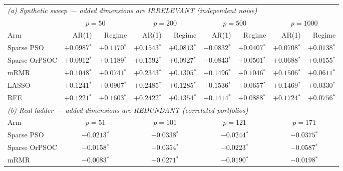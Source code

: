 \begin{table}[htbp]
    \centering
    \small\setlength{\tabcolsep}{4pt}
    \begin{tabular}{lrrrrrrrr}
    \hline
    \multicolumn{9}{l}{\textit{(a) Synthetic sweep --- added dimensions are IRRELEVANT (independent noise)}} \\
    & \multicolumn{2}{c}{$p = 50$} & \multicolumn{2}{c}{$p = 200$} & \multicolumn{2}{c}{$p = 500$} & \multicolumn{2}{c}{$p = 1000$} \\
    Arm & AR(1) & Regime & AR(1) & Regime & AR(1) & Regime & AR(1) & Regime \\
    \hline
    Sparse PSO & $+0.0987$$^{*}$ & $+0.1170$$^{*}$ & $+0.1543$$^{*}$ & $+0.0813$$^{*}$ & $+0.0832$$^{*}$ & $+0.0407$$^{*}$ & $+0.0708$$^{*}$ & $+0.0138$$^{*}$ \\
    Sparse OrPSOC & $+0.0912$$^{*}$ & $+0.1189$$^{*}$ & $+0.1592$$^{*}$ & $+0.0927$$^{*}$ & $+0.0843$$^{*}$ & $+0.0501$$^{*}$ & $+0.0688$$^{*}$ & $+0.0155$$^{*}$ \\
    mRMR & $+0.1048$$^{*}$ & $+0.0741$$^{*}$ & $+0.2343$$^{*}$ & $+0.1305$$^{*}$ & $+0.1496$$^{*}$ & $+0.1046$$^{*}$ & $+0.1506$$^{*}$ & $+0.0611$$^{*}$ \\
    LASSO & $+0.1241$$^{*}$ & $+0.0907$$^{*}$ & $+0.2485$$^{*}$ & $+0.1285$$^{*}$ & $+0.1536$$^{*}$ & $+0.0657$$^{*}$ & $+0.1469$$^{*}$ & $+0.0330$$^{*}$ \\
    RFE & $+0.1221$$^{*}$ & $+0.1603$$^{*}$ & $+0.2422$$^{*}$ & $+0.1354$$^{*}$ & $+0.1414$$^{*}$ & $+0.0888$$^{*}$ & $+0.1724$$^{*}$ & $+0.0756$$^{*}$ \\
    \hline
    \multicolumn{9}{l}{\textit{(b) Real ladder --- added dimensions are REDUNDANT (correlated portfolios)}} \\
    Arm & \multicolumn{2}{c}{$p = 51$} & \multicolumn{2}{c}{$p = 101$} & \multicolumn{2}{c}{$p = 121$} & \multicolumn{2}{c}{$p = 171$} \\
    \hline
    Sparse PSO & \multicolumn{2}{c}{$-0.0213$$^{*}$} & \multicolumn{2}{c}{$-0.0338$$^{*}$} & \multicolumn{2}{c}{$-0.0244$$^{*}$} & \multicolumn{2}{c}{$-0.0375$$^{*}$} \\
    Sparse OrPSOC & \multicolumn{2}{c}{$-0.0158$$^{*}$} & \multicolumn{2}{c}{$-0.0354$$^{*}$} & \multicolumn{2}{c}{$-0.0223$$^{*}$} & \multicolumn{2}{c}{$-0.0587$$^{*}$} \\
    mRMR & \multicolumn{2}{c}{$-0.0083$$^{*}$} & \multicolumn{2}{c}{$-0.0271$$^{*}$} & \multicolumn{2}{c}{$-0.0190$$^{*}$} & \multicolumn{2}{c}{$-0.0198$$^{*}$} \\

\end{tabular}
\end{table}
